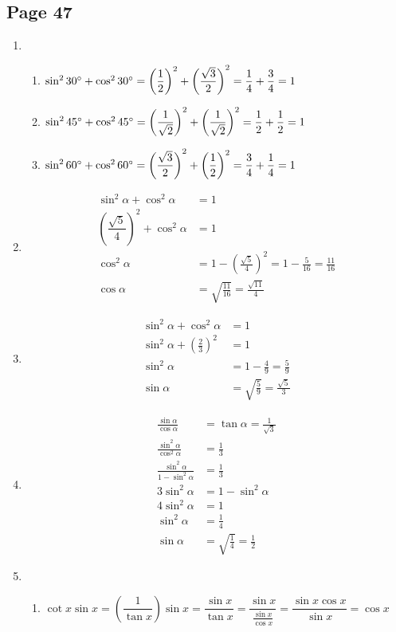 \documentclass{article}
\newenvironment{solutions}[1]
{\subsection*{#1}
 \begin{enumerate}[leftmargin=1.5em]}
{\end{enumerate}}
\newcommand{\solution}{\item}
\newenvironment{subsolutions}
{\begin{enumerate}}
{\end{enumerate}}
\newcommand{\subsolution}{\item}
\begin{document}
\begin{solutions}{Page 47}
\solution %
\begin{subsolutions}
\subsolution $\sin^{2}{30\degree} + \cos^{2}{30\degree} = \left(\dfrac{1}{2}\right)^2 + \left(\dfrac{\sqrt{3}}{2}\right)^2 = \dfrac{1}{4} + \dfrac{3}{4} = 1$
\subsolution $\sin^{2}{45\degree} + \cos^{2}{45\degree} = \left(\dfrac{1}{\sqrt{2}}\right)^2 + \left(\dfrac{1}{\sqrt{2}}\right)^2 = \dfrac{1}{2} + \dfrac{1}{2} = 1$
\subsolution $\sin^{2}{60\degree} + \cos^{2}{60\degree} = \left(\dfrac{\sqrt{3}}{2}\right)^2 + \left(\dfrac{1}{2}\right)^2= \dfrac{3}{4} + \dfrac{1}{4} = 1$
\end{subsolutions}

\solution %
\begin{align*}
\sin^{2}{\alpha} + \cos^{2}{\alpha} &= 1 \\
\left(\dfrac{\sqrt{5}}{4}\right)^2 + \cos^{2}{\alpha} &= 1 \\
\cos^{2}{\alpha} &= 1 - \left(\frac{\sqrt{5}}{4}\right)^2 = 1 - \frac{5}{16} = \frac{11}{16} \\
\cos{\alpha} &= \sqrt{\frac{11}{16}} = \frac{\sqrt{11}}{4}
\end{align*}

\solution %
\begin{align*}
\sin^{2}{\alpha} + \cos^{2}{\alpha} &= 1 \\
\sin^{2}{\alpha} + \left(\frac{2}{3}\right)^2 &= 1 \\
\sin^{2}{\alpha} &= 1 - \frac{4}{9} = \frac{5}{9} \\
\sin{\alpha} &= \sqrt{\frac{5}{9}} = \frac{\sqrt{5}}{3}
\end{align*}

\solution %
\begin{align*}
\frac{\sin{\alpha}}{\cos{\alpha}} &= \tan{\alpha} = \frac{1}{\sqrt{3}} \\
\frac{\sin^{2}{\alpha}}{\cos^{2}{\alpha}} &= \frac{1}{3} \\
\frac{\sin^{2}{\alpha}}{1 - \sin^{2}{\alpha}} &= \frac{1}{3} \\
3\sin^{2}{\alpha} &= 1 - \sin^{2}{\alpha} \\
4\sin^{2}{\alpha} &= 1 \\
\sin^{2}{\alpha} &= \frac{1}{4} \\
\sin{\alpha} &= \sqrt{\frac{1}{4}} = \frac{1}{2}
\end{align*}

\solution %
\begin{subsolutions}
\subsolution %
$\cot{x}\sin{x} = \left(\dfrac{1}{\tan{x}}\right)\sin{x} = \dfrac{\sin{x}}{\tan{x}} = \dfrac{\sin{x}}{\frac{\sin{x}}{\cos{x}}} = \dfrac{\sin{x}\cos{x}}{\sin{x}} = \cos{x}$



\end{subsolutions}
\end{solutions}
\end{document}
